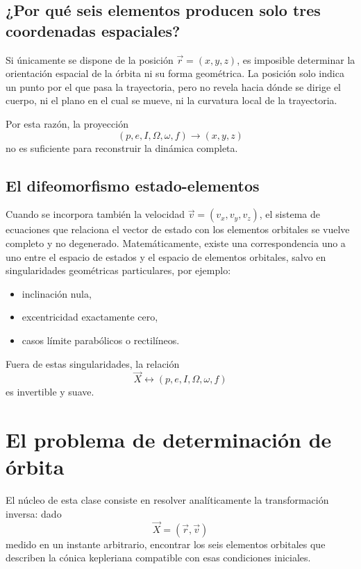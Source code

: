 \subsection{¿Por qué seis elementos producen solo tres coordenadas espaciales?}
Si únicamente se dispone de la posición \(\vec{r} = (x,y,z)\), es imposible determinar la orientación espacial de la órbita ni su forma geométrica. La posición solo indica un punto por el que pasa la trayectoria, pero no revela hacia dónde se dirige el cuerpo, ni el plano en el cual se mueve, ni la curvatura local de la trayectoria.

Por esta razón, la proyección
\[
(p,e,I,\Omega,\omega,f) \longrightarrow (x,y,z)
\]
no es suficiente para reconstruir la dinámica completa.

\subsection{El difeomorfismo estado-elementos}
Cuando se incorpora también la velocidad \(\vec{v} = (v_x,v_y,v_z)\), el sistema de ecuaciones que relaciona el vector de estado con los elementos orbitales se vuelve completo y no degenerado. Matemáticamente, existe una correspondencia uno a uno entre el espacio de estados y el espacio de elementos orbitales, salvo en singularidades geométricas particulares, por ejemplo:
\begin{itemize}
    \item inclinación nula,
    \item excentricidad exactamente cero,
    \item casos límite parabólicos o rectilíneos.
\end{itemize}

Fuera de estas singularidades, la relación
\[
\vec{X} \longleftrightarrow (p,e,I,\Omega,\omega,f)
\]
es invertible y suave.

\section{El problema de determinación de órbita}
El núcleo de esta clase consiste en resolver analíticamente la transformación inversa: dado
\[
\vec{X} = (\vec{r},\vec{v})
\]
medido en un instante arbitrario, encontrar los seis elementos orbitales que describen la cónica kepleriana compatible con esas condiciones iniciales.

